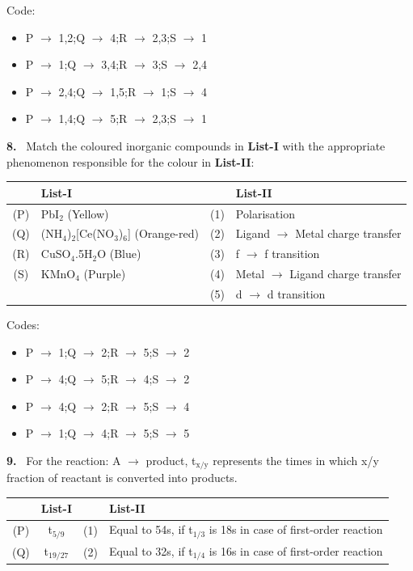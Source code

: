 \documentclass[10pt]{extarticle}
\newcommand{\qn}[1]{\par\smallskip\noindent\textbf{#1.}~}
\newenvironment{qoptions}{\begin{itemize}[leftmargin=1.8em,itemsep=1pt,topsep=2pt,label={}]}{\end{itemize}}
\newcommand{\opt}[2]{\item[(#1)] #2}
\begin{document}
\begin{multicols}{2}
Code:
\begin{qoptions}
\opt{A}{P $\rightarrow$ 1,2;Q $\rightarrow$ 4;R $\rightarrow$ 2,3;S $\rightarrow$ 1}
\opt{B}{P $\rightarrow$ 1;Q $\rightarrow$ 3,4;R $\rightarrow$ 3;S $\rightarrow$ 2,4}
\opt{C}{P $\rightarrow$ 2,4;Q $\rightarrow$ 1,5;R $\rightarrow$ 1;S $\rightarrow$ 4}
\opt{D}{P $\rightarrow$ 1,4;Q $\rightarrow$ 5;R $\rightarrow$ 2,3;S $\rightarrow$ 1}
\end{qoptions}
\qn{8} Match the coloured inorganic compounds in \textbf{List-I} with the appropriate phenomenon responsible for the colour in \textbf{List-II}:\par
{\footnotesize\setlength{\tabcolsep}{1.5pt}\noindent\begin{tabular}{|c|L{3.6cm}|c|L{3.3cm}|}
\hline
 & List-I & & List-II \\
\hline
(P) & PbI$_2$ (Yellow) & (1) & Polarisation \\
\hline
(Q) & (NH$_4$)$_2$[Ce(NO$_3$)$_6$] (Orange-red) & (2) & Ligand $\rightarrow$ Metal charge transfer \\
\hline
(R) & CuSO$_4$.5H$_2$O (Blue) & (3) & f $\rightarrow$ f transition \\
\hline
(S) & KMnO$_4$ (Purple) & (4) & Metal $\rightarrow$ Ligand charge transfer \\
\hline
 & & (5) & d $\rightarrow$ d transition \\
\hline
\end{tabular}}\par
Codes:
\begin{qoptions}
\opt{A}{P $\rightarrow$ 1;Q $\rightarrow$ 2;R $\rightarrow$ 5;S $\rightarrow$ 2}
\opt{B}{P $\rightarrow$ 4;Q $\rightarrow$ 5;R $\rightarrow$ 4;S $\rightarrow$ 2}
\opt{C}{P $\rightarrow$ 4;Q $\rightarrow$ 2;R $\rightarrow$ 5;S $\rightarrow$ 4}
\opt{D}{P $\rightarrow$ 1;Q $\rightarrow$ 4;R $\rightarrow$ 5;S $\rightarrow$ 5}
\end{qoptions}
\qn{9} For the reaction: A $\rightarrow$ product, t$_{\text{x/y}}$ represents the times in which x/y fraction of reactant is converted into products.\par
{\footnotesize\setlength{\tabcolsep}{1.5pt}\noindent\begin{tabular}{|c|c|c|L{5.3cm}|}
\hline
 & List-I & & List-II \\
\hline
(P) & t$_{5/9}$ & (1) & Equal to 54s, if t$_{1/3}$ is 18s in case of first-order reaction \\
\hline
(Q) & t$_{19/27}$ & (2) & Equal to 32s, if t$_{1/4}$ is 16s in case of first-order reaction \\

\end{tabular}}
\end{multicols}
\end{document}
